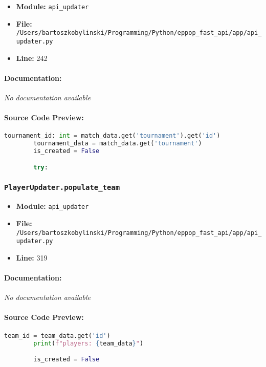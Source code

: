 \documentclass[11pt,a4paper]{article}
\begin{document}
\begin{itemize}
    \item \textbf{Module:} \texttt{api\_updater}
    \item \textbf{File:} \texttt{/Users/bartoszkobylinski/Programming/Python/eppop\_fast\_api/app/api\_updater.py}
    \item \textbf{Line:} 242
\end{itemize}

\paragraph{Documentation:} \textit{No documentation available}

\paragraph{Source Code Preview:}
\begin{lstlisting}[language=Python]
        tournament_id: int = match_data.get('tournament').get('id')
        tournament_data = match_data.get('tournament')
        is_created = False

        try:
\end{lstlisting}

\vspace{1em}
\subsubsection{\texttt{PlayerUpdater.populate\_team}}

\begin{itemize}
    \item \textbf{Module:} \texttt{api\_updater}
    \item \textbf{File:} \texttt{/Users/bartoszkobylinski/Programming/Python/eppop\_fast\_api/app/api\_updater.py}
    \item \textbf{Line:} 319
\end{itemize}

\paragraph{Documentation:} \textit{No documentation available}

\paragraph{Source Code Preview:}
\begin{lstlisting}[language=Python]
        team_id = team_data.get('id')
        print(f"players: {team_data}")

        is_created = False

\end{lstlisting}
\end{document}
